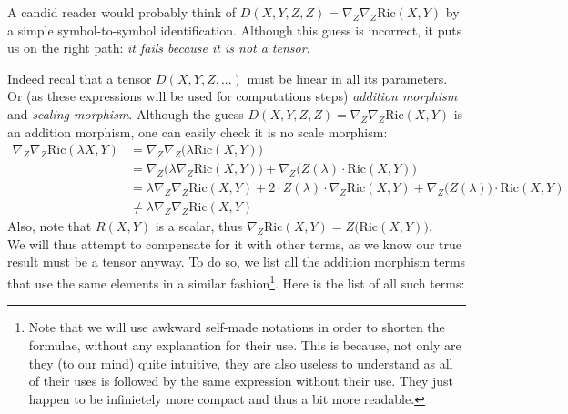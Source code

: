 \documentclass[a4paper,11pt]{article}
\newcommand{\R}{{\mathrm{Ric}}}
\begin{document}
A candid reader would probably think of $D(X,Y,Z,Z)=\nabla_Z \nabla_Z \R(X,Y)$ by a simple symbol-to-symbol identification. Although this guess is incorrect, it puts us on the right path: \emph{it fails because it is not a tensor}.

Indeed recal that a tensor $D(X,Y,Z,...)$ must be linear in all its parameters. Or (as these expressions will be used for computations steps) \emph{addition morphism} and \emph{scaling morphism}. Although the guess $D(X,Y,Z,Z)=\nabla_Z \nabla_Z \R(X,Y)$ is an addition morphism, one can easily check it is no scale morphism:
\begin{align*}
\nabla_Z \nabla_Z \R(\lambda X,Y)
    &=\nabla_Z \nabla_Z\big( \lambda \R(X,Y) \big)\\
    &= \nabla_Z \big(\lambda\nabla_Z \R(X,Y) \big)
    + \nabla_Z \big( Z(\lambda) \cdot \R(X,Y) \big)\\
    &= \lambda \nabla_Z \nabla_Z \R(X,Y)
    + 2 \cdot Z(\lambda) \cdot \nabla_Z \R(X,Y)
    + \nabla_Z \big( Z(\lambda)\big) \cdot \R(X,Y)\\
    &\ne \lambda \nabla_Z \nabla_Z \R(X,Y)
\end{align*}
Also, note that $R(X,Y)$ is a scalar, thus $\nabla_Z\R(X,Y)=Z\big(\R(X,Y)\big)$.\\

We will thus attempt to compensate for it with other terms, as we know our true result must be a tensor anyway. To do so, we list all the addition morphism terms that use the same elements in a similar fashion\footnote{Note that we will use awkward self-made notations in order to shorten the formulae, without any explanation for their use. This is because, not only are they (to our mind) quite intuitive, they are also useless to understand as all of their uses is followed by the same expression without their use. They just happen to be infinietely more compact and thus a bit more readable.}. Here is the list of all such terms:
\end{document}
